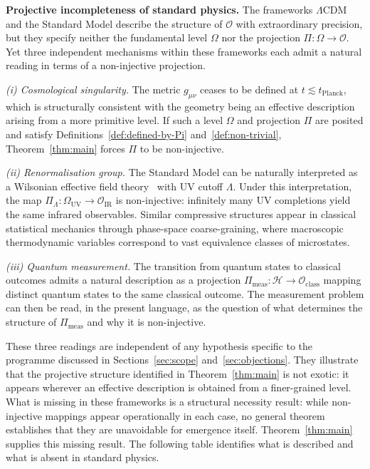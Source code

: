 \documentclass[12pt,a4paper]{article}
\begin{document}
  \textbf{Projective incompleteness of standard physics.}
  The frameworks $\Lambda$CDM and the Standard Model describe the structure of
  $\mathcal{O}$ with extraordinary precision, but they specify neither the
  fundamental level $\Omega$ nor the projection $\Pi : \Omega \to \mathcal{O}$.
  Yet three independent mechanisms within these frameworks each admit a
  natural reading in terms of a non-injective projection.

  \emph{(i) Cosmological singularity.}
  The metric $g_{\mu\nu}$ ceases to be defined at $t \lesssim t_\mathrm{Planck}$,
  which is structurally consistent with the geometry being an effective
  description arising from a more primitive level.
  If such a level $\Omega$ and projection $\Pi$ are posited and satisfy
  Definitions~\ref{def:defined-by-Pi} and~\ref{def:non-trivial},
  Theorem~\ref{thm:main} forces $\Pi$ to be non-injective.

  \emph{(ii) Renormalisation group.}
  The Standard Model can be naturally interpreted as a Wilsonian effective
  field theory~\citep{Wilson1975} with UV cutoff $\Lambda$.
  Under this interpretation, the map
  $\Pi_\Lambda : \Omega_\mathrm{UV} \to \mathcal{O}_\mathrm{IR}$
  is non-injective: infinitely many UV completions yield the
  same infrared observables.
  Similar compressive structures appear in classical statistical mechanics
  through phase-space coarse-graining, where macroscopic thermodynamic
  variables correspond to vast equivalence classes of microstates.

  \emph{(iii) Quantum measurement.}
  The transition from quantum states to classical outcomes admits a natural
  description as a projection
  $\Pi_\mathrm{meas} : \mathcal{H} \to \mathcal{O}_\mathrm{class}$
  mapping distinct quantum states to the same classical outcome.
  The measurement problem can then be read, in the present language, as the
  question of what determines the structure of $\Pi_\mathrm{meas}$ and why
  it is non-injective.

  These three readings are independent of any hypothesis specific to
  the programme discussed in Sections~\ref{sec:scope} and~\ref{sec:objections}.
  They illustrate that the projective structure identified in
  Theorem~\ref{thm:main} is not exotic: it appears wherever an effective
  description is obtained from a finer-grained level.
  What is missing in these frameworks is a structural necessity result:
  while non-injective mappings appear operationally in each case, no general
  theorem establishes that they are unavoidable for emergence itself.
  Theorem~\ref{thm:main} supplies this missing result.
  The following table identifies what is described and what is absent in
  standard physics.
\end{document}
